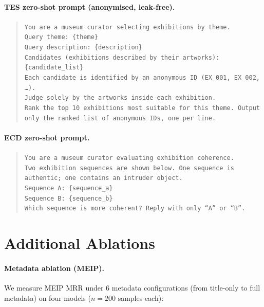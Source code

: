 \documentclass[11pt]{article}
\newcommand{\meip}{\textsc{MEIP}}
\begin{document}
\paragraph{TES zero-shot prompt (anonymised, leak-free).}
\begin{quote}
\texttt{You are a museum curator selecting exhibitions by theme.\\
Query theme: \{theme\}\\
Query description: \{description\}\\
Candidates (exhibitions described by their artworks):\\
\{candidate\_list\}\\
Each candidate is identified by an anonymous ID (EX\_001, EX\_002, \ldots).\\
Judge solely by the artworks inside each exhibition.\\
Rank the top 10 exhibitions most suitable for this theme.
Output only the ranked list of anonymous IDs, one per line.}
\end{quote}

\paragraph{ECD zero-shot prompt.}
\begin{quote}
\texttt{You are a museum curator evaluating exhibition coherence.\\
Two exhibition sequences are shown below.
One sequence is authentic; one contains an intruder object.\\
Sequence A: \{sequence\_a\}\\
Sequence B: \{sequence\_b\}\\
Which sequence is more coherent? Reply with only ``A'' or ``B''.}
\end{quote}

\section{Additional Ablations}
\label{app:ablations}

\paragraph{Metadata ablation (\meip{}).}
We measure MEIP MRR under 6 metadata configurations
(from title-only to full metadata) on four models ($n{=}200$ samples each):
\end{document}
